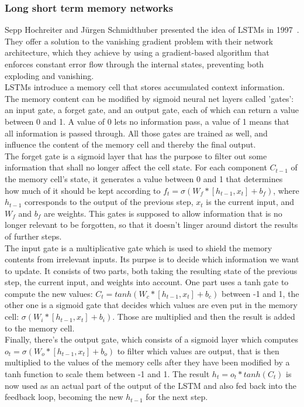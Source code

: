 \documentclass[
	a4paper,
	pagesize,
	pdftex,
	12pt,
	twoside, %
	BCOR=5mm, %
	ngerman,
	fleqn,
	final,
	]{scrartcl}
\begin{document}
\subsubsection{Long short term memory networks}\label{LSTM}
Sepp Hochreiter and Jürgen Schmidthuber presented the idea of LSTMs in 1997~\cite{Hochreiter.1997}. They offer a solution to the vanishing gradient problem with their network architecture, which they achieve by using a gradient-based algorithm that enforces constant error flow through the internal states, preventing both exploding and vanishing.\\
LSTMs introduce a memory cell that stores accumulated context information. The memory content can be modified by sigmoid neural net layers called 'gates': an input gate, a forget gate, and an output gate, each of which can return a value between 0 and 1. A value of 0 lets no information pass, a value of 1 means that all information is passed through. All those gates are trained as well, and influence the content of the memory cell and thereby the final output.\\
The forget gate is a sigmoid layer that has the purpose to filter out some information that shall no longer affect the cell state. For each component $C_{t-1}$ of the memory cell's state, it generates a value between 0 and 1 that determines how much of it should be kept according to $f_t = \sigma (W_f * [h_{t-1}, x_t] + b_f)$, where $h_{t-1}$ corresponds to the output of the previous step, $x_t$ is the current input, and $W_f$ and $b_f$ are weights. This gates is supposed to allow information that is no longer relevant to be forgotten, so that it doesn't linger around distort the results of further steps.\\
The input gate is a multiplicative gate which is used to shield the memory contents from irrelevant inputs. Its purpse is to decide which information we want to update. It consists of two parts, both taking the resulting state of the previous step, the current input, and weights into account. One part uses a tanh gate to compute the new values: $C_t = tanh (W_c * [h_{t-1} , x_t] + b_c)$ between -1 and 1, the other one is a sigmoid gate that decides which values are even put in the memory cell: $\sigma (W_i * [h_{t-1}, x_t] + b_i)$. Those are multiplied and then the result is added to the memory cell.\\
Finally, there's the output gate, which consists of a sigmoid layer which computes $o_t = \sigma (W_o * [h_{t-1}, x_t] + b_o)$ to filter which values are output, that is then multiplied to the values of the memory cells after they have been modified by a tanh function to scale them between -1 and 1. The result $h_t = o_t * tanh(C_t)$ is now used as an actual part of the output of the LSTM and also fed back into the feedback loop, becoming the new $h_{t-1}$ for the next step.	
\end{document}
